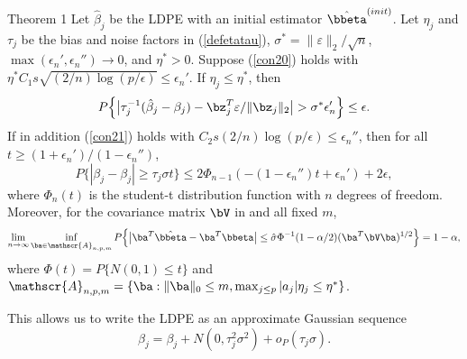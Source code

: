 \begin{frame}
\begin{block}{Theorem 1}
\scriptsize
Let $\hat{\beta}_j$ be the LDPE with an initial estimator $\hat{\bbeta}^{(init)}$.
Let $\eta_j$ and $\tau_j$ be the bias and noise factors in (\ref{defetatau}),
$\sigma^*=\|\varepsilon\|_2/\sqrt{n}$,
$\max(\epsilon_n',\epsilon_n'')\to 0$, and $\eta^*>0$.
Suppose (\ref{con20}) holds with $\eta^*C_1s\sqrt{(2/n)\log(p/\epsilon)} \leq \epsilon_n'$.
If $\eta_j \leq \eta^*$, then
\begin{equation}
\label{thm22}
P\Big\{ \big|\tau_j^{-1}(\hat{\beta}_j - \beta_j) - \bz_j^T \varepsilon/\|\bz_j\|_2\big|
> \sigma^* \epsilon_n'\Big\} \leq \epsilon.
\end{equation}
If in addition (\ref{con21}) holds with $C_2 s (2/n)\log(p/\epsilon)\leq \epsilon_n''$, then for all
$t\ge (1+\epsilon_n')/(1-\epsilon_n'')$,
\begin{equation}
\label{thm23}
P\Big\{|\beta_j - \beta_j| \ge \tau_j\sigma t\Big\}\le 2\Phi_{n-1}(-(1-\epsilon_n'')t+\epsilon_n')+2\epsilon,
\end{equation}
where $\Phi_n(t)$ is the student-t distribution function with $n$ degrees of freedom.
Moreover, for the covariance matrix $\bV$ in and all fixed $m$,
\begin{equation}
\label{thm24}
\lim_{n\to\infty}
\inf_{\ba\in \mathscr{A}_{n,p,m}}P\Big\{\big|\ba^T\hat{\bbeta} - \ba^T\bbeta\big|
\leq \hat{\sigma}\Phi^{-1}(1-\alpha/2)(\ba^T\bV\ba)^{1/2}\Big\} = 1-\alpha,
\end{equation}
where $\Phi(t) = P\{ N(0,1)\le t\}$ and
$\mathscr{A}_{n,p,m}=\{\ba: \|\ba\|_0 \leq m, \max_{j \leq p}|a_j|\eta_j\leq \eta^*\}$.
\end{block}
\medskip   
    This allows us to write the LDPE as an approximate Gaussian sequence
\begin{equation}
\label{Gauseq}
\beta_j = \beta_j + N(0,\tau_j^2\sigma^2) + o_P(\tau_j\sigma).
\end{equation}
\end{frame}


